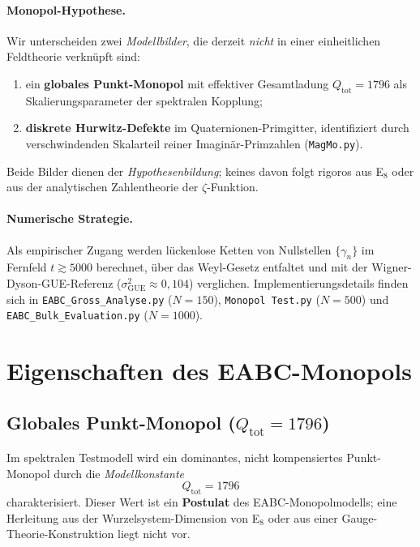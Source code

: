 \documentclass[11pt,a4paper]{article}
\begin{document}
\paragraph{Monopol-Hypothese.}
Wir unterscheiden zwei \emph{Modellbilder}, die derzeit \emph{nicht} in einer
einheitlichen Feldtheorie verknüpft sind:
\begin{enumerate}
  \item ein \textbf{globales Punkt-Monopol} mit effektiver Gesamtladung
        $Q_{\mathrm{tot}}=1796$ als Skalierungsparameter der spektralen Kopplung;
  \item \textbf{diskrete Hurwitz-Defekte} im Quaternionen-Primgitter, identifiziert
        durch verschwindenden Skalarteil reiner Imaginär-Primzahlen
        (\texttt{MagMo.py}).
\end{enumerate}
Beide Bilder dienen der \emph{Hypothesenbildung}; keines davon folgt rigoros aus
E$_8$ oder aus der analytischen Zahlentheorie der $\zeta$-Funktion.

\paragraph{Numerische Strategie.}
Als empirischer Zugang werden lückenlose Ketten von Nullstellen $\{\gamma_n\}$
im Fernfeld $t\gtrsim 5000$ berechnet, über das Weyl-Gesetz entfaltet und mit
der Wigner-Dyson-GUE-Referenz ($\sigma^2_{\mathrm{GUE}}\approx 0{,}104$) verglichen.
Implementierungsdetails finden sich in \texttt{EABC\_Gross\_Analyse.py} ($N=150$),
\texttt{Monopol Test.py} ($N=500$) und \texttt{EABC\_Bulk\_Evaluation.py} ($N=1000$).

\section{Eigenschaften des EABC-Monopols}
\label{sec:monopol-eigenschaften}

\subsection{Globales Punkt-Monopol ($Q_{\mathrm{tot}}=1796$)}

Im spektralen Testmodell wird ein dominantes, nicht kompensiertes Punkt-Monopol
durch die \emph{Modellkonstante}
\begin{equation}
  Q_{\mathrm{tot}} = 1796
  \label{eq:qtot}
\end{equation}
charakterisiert. Dieser Wert ist ein \textbf{Postulat} des EABC-Monopolmodells;
eine Herleitung aus der Wurzelsystem-Dimension von E$_8$ oder aus einer
Gauge-Theorie-Konstruktion liegt nicht vor.
\end{document}
